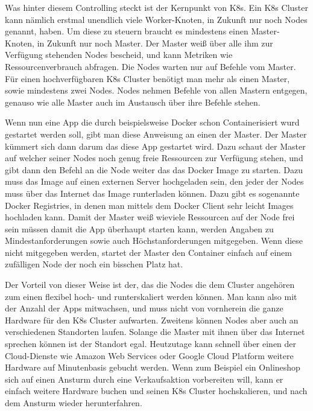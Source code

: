 Was hinter diesem Controlling steckt ist der Kernpunkt von K8s. Ein K8s Cluster kann nämlich erstmal unendlich viele Worker-Knoten, in Zukunft nur noch Nodes genannt, haben. Um diese zu steuern braucht es mindestens
einen Master-Knoten, in Zukunft nur noch Master. Der Master weiß über alle ihm zur Verfügung stehenden Nodes bescheid, und kann Metriken wie Ressourcenverbrauch abfragen. Die Nodes warten nur auf Befehle vom Master.
Für einen hochverfügbaren K8s Cluster benötigt man mehr als einen Master, sowie mindestens zwei Nodes. Nodes nehmen Befehle von allen Mastern entgegen, genauso wie alle Master auch im Austausch über ihre Befehle stehen.

Wenn nun eine App die durch beispielsweise Docker schon Containerisiert wurd gestartet werden soll, gibt man diese Anweisung an einen der Master. Der Master kümmert sich dann darum das diese App gestartet wird.
Dazu schaut der Master auf welcher seiner Nodes noch genug freie Ressourcen zur Verfügung stehen, und gibt dann den Befehl an die Node weiter das das Docker Image zu starten. Dazu muss das Image
auf einen externen Server hochgeladen sein, den jeder der Nodes muss über das Internet das Image runterladen können. Dazu gibt es sogenannte Docker Registries, in denen man mittels dem Docker Client
sehr leicht Images hochladen kann.
Damit der Master weiß wieviele Ressourcen auf der Node frei sein müssen damit die App überhaupt starten kann, werden Angaben zu Mindestanforderungen sowie auch Höchstanforderungen mitgegeben. Wenn diese 
nicht mitgegeben werden, startet der Master den Container einfach auf einem zufälligen Node der noch ein bisschen Platz hat.

Der Vorteil von dieser Weise ist der, das die Nodes die dem Cluster angehören zum einen flexibel hoch- und runterskaliert werden können. Man kann also mit der Anzahl der Apps mitwachsen, und muss nicht von vornherein die ganze Hardware
für den K8s Cluster aufwarten. Zweitens können Nodes aber auch an verschiedenen Standorten laufen. Solange die Master mit ihnen über das Internet sprechen können ist der Standort egal.
Heutzutage kann schnell über einen der Cloud-Dienste wie Amazon Web Services oder Google Cloud Platform weitere Hardware auf Minutenbasis gebucht werden. Wenn zum Beispiel ein Onlineshop sich auf einen
Ansturm durch eine Verkaufsaktion vorbereiten will, kann er einfach weitere Hardware buchen und seinen K8s Cluster hochskalieren, und nach dem Ansturm wieder herunterfahren.

